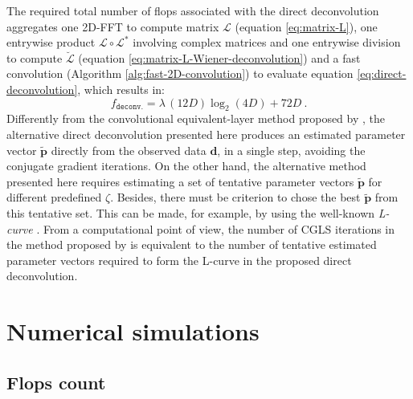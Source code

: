 \documentclass[utf8]{FrontiersinHarvard} %
\begin{document}
	The required total number of flops associated with the direct deconvolution 
	aggregates one 2D-FFT to compute matrix $\boldsymbol{\mathcal{L}}$ (equation \ref{eq:matrix-L}),
	one entrywise product $\boldsymbol{\mathcal{L}} \circ \boldsymbol{\mathcal{L}}^{\ast}$ involving complex matrices and
	one entrywise division to compute $\breve{\boldsymbol{\mathcal{L}}}$ (equation \ref{eq:matrix-L-Wiener-deconvolution}) and
	a fast convolution (Algorithm \ref{alg:fast-2D-convolution}) to evaluate equation \ref{eq:direct-deconvolution},
	which results in:
	\begin{equation}
		f_{\mathtt{deconv.}} = \lambda \, (12D)\log_{2}(4D) + 72D \: .
		\label{flops:direct-deconv}
	\end{equation}
	Differently from the convolutional equivalent-layer method proposed by 
	\citet{takahashi-etal2020, takahashi-etal2022}, the alternative direct deconvolution presented here 
	produces an estimated parameter vector $\tilde{\mathbf{p}}$ directly from the observed data $\mathbf{d}$, in a single step,
	avoiding the conjugate gradient iterations.
	On the other hand, the alternative method presented here requires estimating a set of tentative parameter vectors $\tilde{\mathbf{p}}$
	for different predefined $\zeta$. Besides, there must be criterion to chose the best $\tilde{\mathbf{p}}$ from this tentative set.
	This can be made, for example, by using the well-known \textit{L-curve} \citep{hansen1992}.
	From a computational point of view, the number of CGLS iterations in the method proposed by \citet{takahashi-etal2020, takahashi-etal2022}
	is equivalent to the number of tentative estimated parameter vectors required to form the L-curve in the proposed
	direct deconvolution.
	
	\section{Numerical simulations}
	\label{sec:numerical-simulations}
	
	\subsection{Flops count}
	\label{subsec:flops-count}
	
\end{document}
